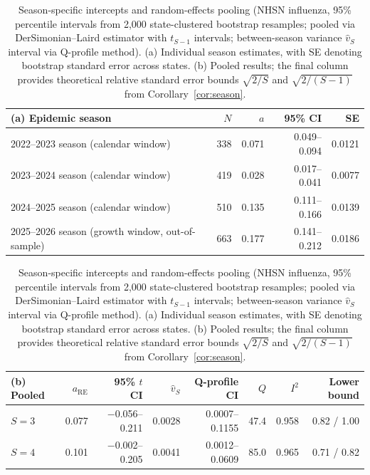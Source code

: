 \begin{table}[!htbp]
  \centering
  \caption{Season-specific intercepts and random-effects pooling (NHSN influenza, 95\% percentile intervals from 2,000 state-clustered bootstrap resamples; pooled via DerSimonian--Laird estimator with $t_{S-1}$ intervals; between-season variance $\hat{v}_S$ interval via Q-profile method). (a) Individual season estimates, with SE denoting bootstrap standard error across states. (b) Pooled results; the final column provides theoretical relative standard error bounds $\sqrt{2/S}$ and $\sqrt{2/(S-1)}$ from Corollary~\ref{cor:season}.}
  \label{tab:s-seasons}
  \small
  \begin{tabular}{@{}lrrrr@{}}
    \toprule
    (a) Epidemic season & $N$ & $a$ & 95\% CI & SE \\
    \midrule
    2022--2023 season (calendar window) & 338 & 0.071 & 0.049--0.094 & 0.0121 \\
    2023--2024 season (calendar window) & 419 & 0.028 & 0.017--0.041 & 0.0077 \\
    2024--2025 season (calendar window) & 510 & 0.135 & 0.111--0.166 & 0.0139 \\
    2025--2026 season (growth window, out-of-sample) & 663 & 0.177 & 0.141--0.212 & 0.0186 \\
    \bottomrule
  \end{tabular}

  \medskip
  \begin{tabular}{@{}lrrrrrrr@{}}
    \toprule
    (b) Pooled & $a_{\mathrm{RE}}$ & 95\% $t$ CI & $\hat{v}_S$ & Q-profile CI & $Q$ & $I^2$ & Lower bound \\
    \midrule
    $S=3$ & 0.077 & $-$0.056--0.211 & 0.0028 & 0.0007--0.1155 & 47.4 & 0.958 & 0.82 / 1.00 \\
    $S=4$ & 0.101 & $-$0.002--0.205 & 0.0041 & 0.0012--0.0609 & 85.0 & 0.965 & 0.71 / 0.82 \\
    \bottomrule
  \end{tabular}
\end{table}
